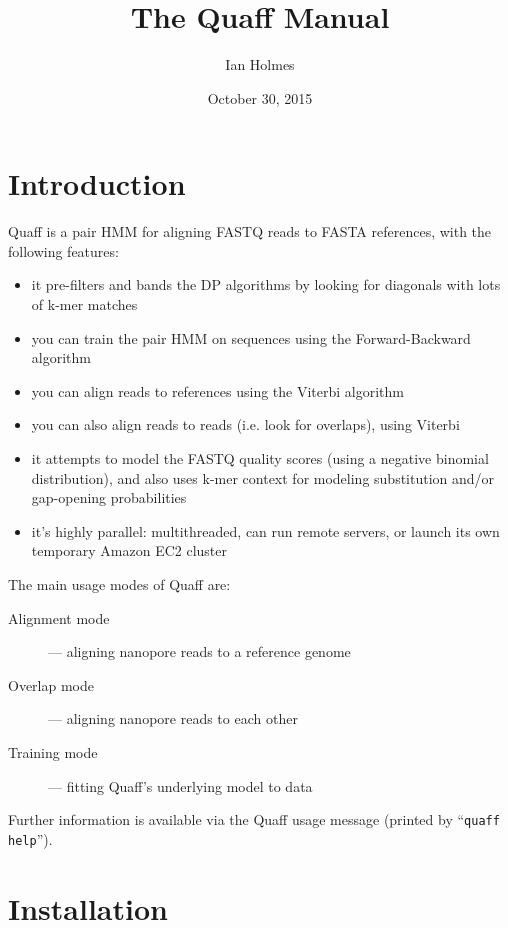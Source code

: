 \documentclass{article}
\date{October 30, 2015}
\author{Ian Holmes}
\title{The Quaff Manual}
\begin{document}
\maketitle
\tableofcontents

\section{Introduction}

Quaff is a pair HMM for aligning FASTQ reads to FASTA references,
with the following features:

\begin{itemize}
\item it pre-filters and bands the DP algorithms by looking for diagonals
  with lots of k-mer matches

\item you can train the pair HMM on sequences using the Forward-Backward
  algorithm

\item you can align reads to references using the Viterbi algorithm

\item you can also align reads to reads (i.e. look for overlaps), using
  Viterbi

\item it attempts to model the FASTQ quality scores (using a negative
  binomial distribution), and also uses k-mer context for modeling
  substitution and/or gap-opening probabilities

\item it's highly parallel: multithreaded, can run remote servers,
  or launch its own temporary Amazon EC2 cluster

\end{itemize}

The main usage modes of Quaff are:
\begin{description}
\item[Alignment mode] --- aligning nanopore reads to a reference genome
\item[Overlap mode] --- aligning nanopore reads to each other
\item[Training mode] --- fitting Quaff's underlying model to data
\end{description}

Further information is available via the Quaff usage message
(printed by ``{\tt quaff help}'').

\section{Installation}
\end{document}
